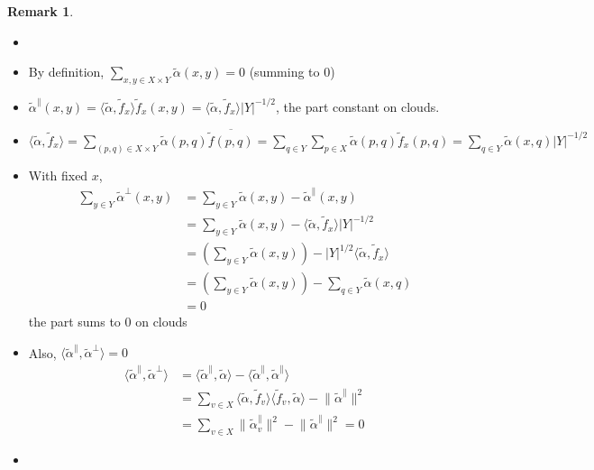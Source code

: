 \documentclass{book}
\newcommand{\inner}[1]{\langle #1 \rangle}
\newcommand{\norm}[1]{\lVert #1 \rVert}
\newcommand{\abs}[1]{\lvert #1 \rvert }
\theoremstyle{definition}
\theoremstyle{remarkstyle}
\newtheorem*{remark}{Remark}%
\begin{document}
\begin{remark}
    \begin{itemize}
        \item[]
        \item By definition, $\sum_{x,y \in X\times Y}\tilde{\alpha}(x,y)=0 $ (summing to 0)
        \item $\tilde{\alpha}^{\parallel}(x,y)= \inner{\tilde{\alpha},\tilde{f}_{x}}\tilde{f}_x(x,y)=\inner{\tilde{\alpha},\tilde{f}_{x}}\abs{Y}^{-1/2}$, the part constant on clouds.
        \item $\inner{\tilde{\alpha}, \tilde{f}_x } = \sum_{(p,q)\in X\times Y}\tilde{\alpha}(p,q)\overline{\tilde{f}(p,q)} = \sum_{q\in Y}\sum_{p\in X}\tilde{\alpha}(p,q)\tilde{f}_x(p,q) = \sum_{q\in Y}\tilde{\alpha}(x,q)\abs{Y}^{-1/2} $
        \item With fixed $x$, 
        \begin{align*}
            \sum_{y\in Y}\tilde{\alpha}^{\perp}(x,y) 
            &= \sum_{y\in Y}\tilde{\alpha}(x,y)-\tilde{\alpha}^{\parallel}(x,y) \\
            &= \sum_{y\in Y}\tilde{\alpha}(x,y)-\inner{\tilde{\alpha},\tilde{f}_{x}}\abs{Y}^{-1/2} \\
            &= \left(\sum_{y\in Y}\tilde{\alpha}(x,y)\right) - \abs{Y}^{1/2}\inner{\tilde{\alpha}, \tilde{f}_x } \\
            &= \left(\sum_{y\in Y}\tilde{\alpha}(x,y)\right) - \sum_{q\in Y}\tilde{\alpha}(x,q) \\
            &= 0
        \end{align*}
        the part sums to 0 on clouds
        \item Also, $\inner{\tilde{\alpha}^{\parallel}, \tilde{\alpha}^{\perp} } =0$
        \begin{align*}
            \inner{\tilde{\alpha}^{\parallel}, \tilde{\alpha}^{\perp} } 
            &= \inner{\tilde{\alpha}^{\parallel}, \tilde{\alpha}} - \inner{\tilde{\alpha}^{\parallel}, \tilde{\alpha}^{\parallel}} \\
            &= \sum_{v\in X}\inner{\tilde{\alpha},\tilde{f}_v}\inner{\tilde{f}_v,\tilde{\alpha}} - \norm{\tilde{\alpha}^{\parallel} }^{2} \\
            &= \sum_{v\in X}\norm{\tilde{\alpha}^{\parallel}_v}^2 - \norm{\tilde{\alpha}^{\parallel} }^{2} = 0
        \end{align*}
        \item[] 
    \end{itemize}
\end{remark}
\end{document}
